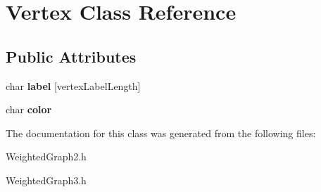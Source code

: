 \hypertarget{class_vertex}{\section{Vertex Class Reference}
\label{class_vertex}
}
\subsection*{Public Attributes}
\begin{DoxyCompactItemize}
\item 
\hypertarget{class_vertex_a13fe33790b41909253d58bb546c4402f}{char {\bfseries label} \mbox{[}vertex\+Label\+Length\mbox{]}}\label{class_vertex_a13fe33790b41909253d58bb546c4402f}

\item 
\hypertarget{class_vertex_ab9455c96462d157dd94b7c1e7cdff135}{char {\bfseries color}}\label{class_vertex_ab9455c96462d157dd94b7c1e7cdff135}

\end{DoxyCompactItemize}


The documentation for this class was generated from the following files\+:\begin{DoxyCompactItemize}
\item 
Weighted\+Graph2.\+h\item 
Weighted\+Graph3.\+h\end{DoxyCompactItemize}
